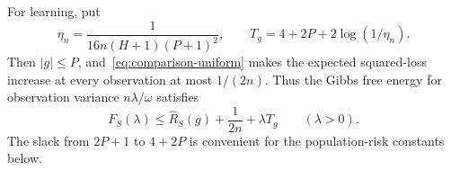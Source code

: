 For learning, put
\begin{equation}
 \eta_n=\frac1{16n(H+1)(P+1)^2},\qquad
 T_g=4+2P+2\log(1/\eta_n).
 \label{eq:teacher-budget}
\end{equation}
Then $|g|\le P$, and~\eqref{eq:comparison-uniform} makes the expected squared-loss increase at every observation at most $1/(2n)$. Thus the Gibbs free energy for observation variance $n\lambda/\omega$ satisfies
\begin{equation}
 F_S(\lambda)\le\widehat R_S(g)+\frac1{2n}+\lambda T_g
 \qquad(\lambda>0).
 \label{eq:free-energy-comparison}
\end{equation}
The slack from $2P+1$ to $4+2P$ is convenient for the population-risk constants below.
